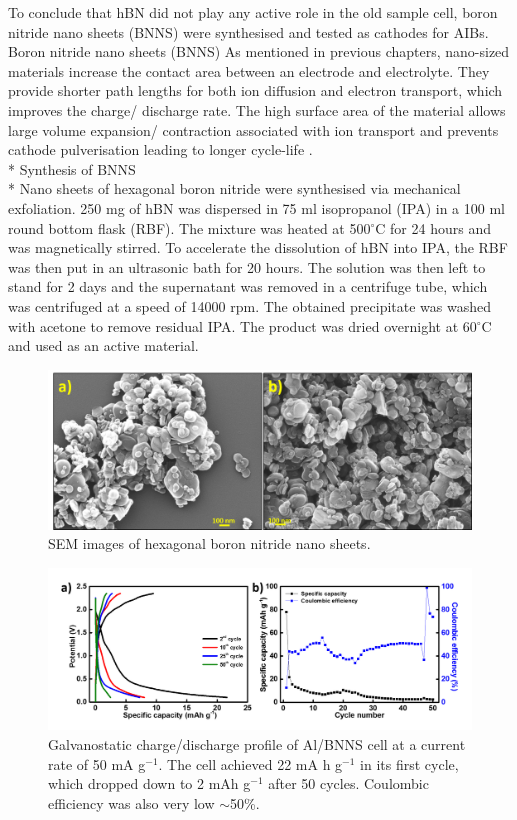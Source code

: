 To conclude that hBN did not play any active role in the old sample cell, boron nitride nano sheets (BNNS) were synthesised and tested as cathodes for AIBs. 
\large{Boron nitride nano sheets (BNNS)}
As mentioned in previous chapters, nano-sized materials increase the contact area between an electrode and electrolyte. They provide shorter path lengths for both ion diffusion and electron transport, which improves the charge/ discharge rate. The high surface area of the material allows large volume expansion/ contraction associated with ion transport and prevents cathode pulverisation leading to longer cycle-life \cite{zhang_ultrathin_2015,cong_intrinsic_2015}. \\*
Synthesis of BNNS \\*
Nano sheets of hexagonal boron nitride were synthesised via mechanical exfoliation. 250 mg of hBN was dispersed in 75 ml isopropanol (IPA) in a 100 ml round bottom flask (RBF). The mixture was heated at 500$^{\circ}$C for 24 hours and was magnetically stirred. To accelerate the dissolution of hBN into IPA, the RBF was then put in an ultrasonic bath for 20 hours. The solution was then left to stand for 2 days and the supernatant was removed in a centrifuge tube, which was centrifuged at a speed of 14000 rpm. The obtained precipitate was washed with acetone to remove residual IPA. The product was dried overnight at 60$^{\circ}$C and used as an active material. 

\begin{figure}[tbh!]
\centering
\includegraphics[width=\textwidth]{Figures/BOhBN/BNNSSEM}
\caption{SEM images of hexagonal boron nitride nano sheets.}
\label{Figures/BOhBN:BNNSSEM}
\end{figure}

\begin{figure}[tbh!]
\centering
\includegraphics[width=\textwidth]{Figures/BOhBN/BNNSCDCCE}
\caption{Galvanostatic charge/discharge profile of Al/BNNS cell at a current rate of 50 mA g$^{-1}$. The cell achieved 22 mA h g$^{-1}$ in its first cycle, which dropped down to 2 mAh g$^{-1}$ after 50 cycles. Coulombic efficiency was also very low $\sim$50\%. }
\label{Figures/BOhBN:BNNSCDCCE}
\end{figure}

